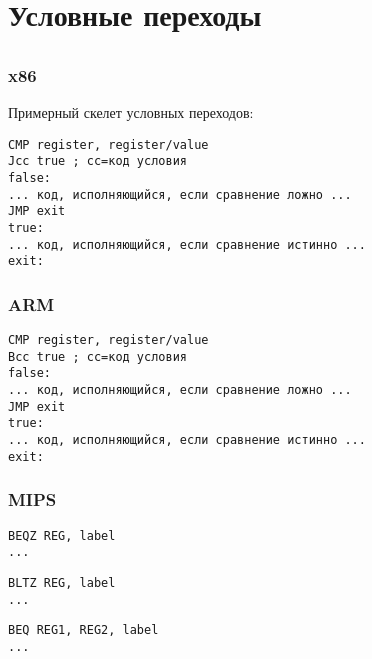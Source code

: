 \section{Условные переходы}
\label{sec:Jcc}






\subsection{\Conclusion{}}

\subsubsection{x86}

Примерный скелет условных переходов:

\begin{lstlisting}[caption=x86]
CMP register, register/value
Jcc true ; cc=код условия
false:
... код, исполняющийся, если сравнение ложно ...
JMP exit 
true:
... код, исполняющийся, если сравнение истинно ...
exit:
\end{lstlisting}

\subsubsection{ARM}

\begin{lstlisting}[caption=ARM]
CMP register, register/value
Bcc true ; cc=код условия
false:
... код, исполняющийся, если сравнение ложно ...
JMP exit 
true:
... код, исполняющийся, если сравнение истинно ...
exit:
\end{lstlisting}

\subsubsection{MIPS}

\begin{lstlisting}[caption=Проверка на ноль]
BEQZ REG, label
...
\end{lstlisting}

\begin{lstlisting}[caption=Меньше ли нуля?]
BLTZ REG, label
...
\end{lstlisting}

\begin{lstlisting}[caption=Проверка на равенство]
BEQ REG1, REG2, label
...
\end{lstlisting}

